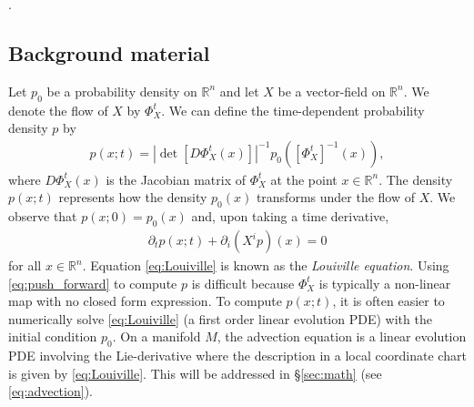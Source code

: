\documentclass[letterpaper, 12 pt]{amsart}
\newcommand{\R}{\mathbb{R}}
\begin{document}
  .

\subsection{Background material}
  Let $p_0$ be a probability density on $\R^n$
  and let $X$ be a vector-field on $\R^n$.
  We denote the flow of $X$
  by $\Phi_X^t$.
  We can define the time-dependent probability
  density $p$ by
  \begin{align}
    p( x ; t) = 
    \left| \det\left[ D\Phi_X^t(x) \right] \right|^{-1} p_0\left( \left[\Phi_X^t\right]^{-1}(x) \right), \label{eq:push_forward}
  \end{align}
  where $D\Phi_X^t(x)$ is the Jacobian matrix of
  $\Phi_X^t$ at the point $x \in \R^n$.
  The density $p(x;t)$ represents how the density
  $p_0(x)$ transforms under the flow of $X$.
  We observe that $p(x;0) = p_0(x)$ and, upon taking
  a time derivative,
  \begin{align}
    \partial_t p (x;t) + \partial_i (X^i p)(x) = 0 \label{eq:Louiville}
  \end{align}
  for all $x \in \R^n$.
  Equation \eqref{eq:Louiville} is known as the \emph{Louiville equation}.
  Using \eqref{eq:push_forward} to compute $p$ is difficult
  because $\Phi_X^t$ is typically a non-linear map with no closed
  form expression.
  To compute $p( x ; t)$, it is often easier
  to numerically solve \eqref{eq:Louiville}
  (a first order linear evolution PDE)
  with the initial condition $p_0$.
  On a manifold $M$, the advection equation is a linear
  evolution PDE involving the Lie-derivative
  where the description in a local coordinate chart is
  given by \eqref{eq:Louiville}.
  This will be addressed in \S \ref{sec:math} (see \eqref{eq:advection}).
\end{document}
